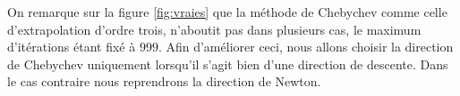 On remarque sur la figure \ref{fig:vraies} que la m\'ethode de Chebychev comme celle d'extrapolation d'ordre trois,
 n'aboutit pas dans plusieurs cas, le maximum d'it\'erations \'etant fix\'e \`a $999$. Afin d'am\'eliorer ceci,
nous allons choisir la direction de Chebychev uniquement lorsqu'il s'agit bien d'une direction de descente.
 Dans le cas contraire nous reprendrons la direction de Newton.

% 
% 
